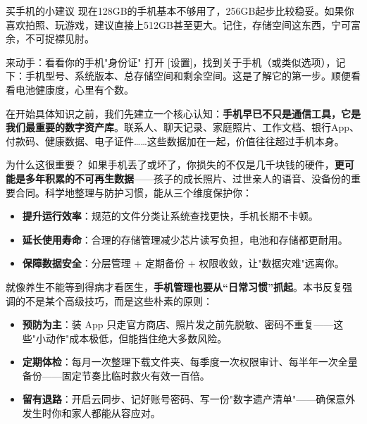 \begin{tcbinfo}{买手机的小建议}
现在128GB的手机基本不够用了，256GB起步比较稳妥。如果你喜欢拍照、玩游戏，建议直接上512GB甚至更大。记住，存储空间这东西，宁可富余，不可捉襟见肘。

\end{tcbinfo}

\begin{tcbpractice}{来动手：看看你的手机"身份证"}
打开 [设置]，找到关于手机（或类似选项），记下：手机型号、系统版本、总存储空间和剩余空间。这是了解它的第一步。顺便看看电池健康度，心里有个数。

\end{tcbpractice}


在开始具体知识之前，我们先建立一个核心认知：\textbf{手机早已不只是通信工具，它是我们最重要的数字资产库}。联系人、聊天记录、家庭照片、工作文档、银行App、付款码、健康数据、电子证件……这些数据加在一起，价值往往超过手机本身。

\begin{tcbinfo}{为什么这很重要？}
如果手机丢了或坏了，你损失的不仅是几千块钱的硬件，\textbf{更可能是多年积累的不可再生数据}——孩子的成长照片、过世亲人的语音、没备份的重要合同。科学地整理与防护习惯，能从三个维度保护你：

\begin{itemize}
  \item \textbf{提升运行效率}：规范的文件分类让系统查找更快，手机长期不卡顿。
  \item \textbf{延长使用寿命}：合理的存储管理减少芯片读写负担，电池和存储都更耐用。
  \item \textbf{保障数据安全}：分层管理 + 定期备份 + 权限收敛，让"数据灾难"远离你。
\end{itemize}

\end{tcbinfo}


就像养生不能等到得病才看医生，\textbf{手机管理也要从“日常习惯”抓起}。本书反复强调的不是某个高级技巧，而是这些朴素的原则：

\begin{itemize}
  \item \textbf{预防为主}：装 App 只走官方商店、照片发之前先脱敏、密码不重复——这些"小动作"成本极低，但能挡住绝大多数风险。
  \item \textbf{定期体检}：每月一次整理下载文件夹、每季度一次权限审计、每半年一次全量备份——固定节奏比临时救火有效一百倍。
  \item \textbf{留有退路}：开启云同步、记好账号密码、写一份"数字遗产清单"——确保意外发生时你和家人都能从容应对。
\end{itemize}
